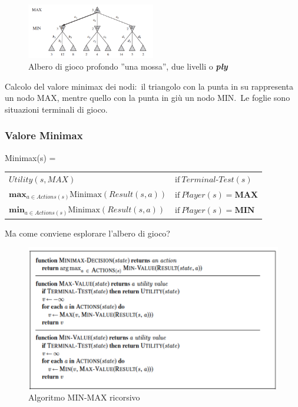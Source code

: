\begin{figure}[H]
	\centering
	\includegraphics[width=0.5\textwidth]{immagini/MinMax.png}
	\caption*{Albero di gioco profondo ''una mossa'', due livelli o \textbf{\textit{ply}}}
\end{figure}

\noindent Calcolo del valore minimax dei nodi:\ il triangolo con la punta in su rappresenta un nodo MAX, mentre quello con la punta in giù un nodo MIN.\
Le foglie sono situazioni terminali di gioco.

\subsubsection{Valore Minimax}

Minimax(s) =
\begin{table}[H]
	\centering
	\begin{tabular}{l l}
		$Utility(s, \mathit{MAX})$                                                & $\mathrm{if}\ \mathit{Terminal\textrm{-}Test}(s)$          \\
		$\mathrm{\mathbf{max}}_{a \in Actions(s)} \mathrm{Minimax}(Result(s, a))$ & $\mathrm{if}\ \mathit{Player}(s) = \mathrm{\mathbf{MAX}}$  \\
		$\mathrm{\mathbf{min}}_{a \in Actions(s)} \mathrm{Minimax}(Result(s, a))$ & $ \mathrm{if}\ \mathit{Player}(s) = \mathrm{\mathbf{MIN}}$ \\
	\end{tabular}
\end{table}

\noindent Ma come conviene esplorare l'albero di gioco?

\begin{figure}[H]
	\centering
	\caption*{Algoritmo MIN-MAX ricorsivo}
	\includegraphics[width=\textwidth]{immagini/MinMax_rec.png}
\end{figure}

